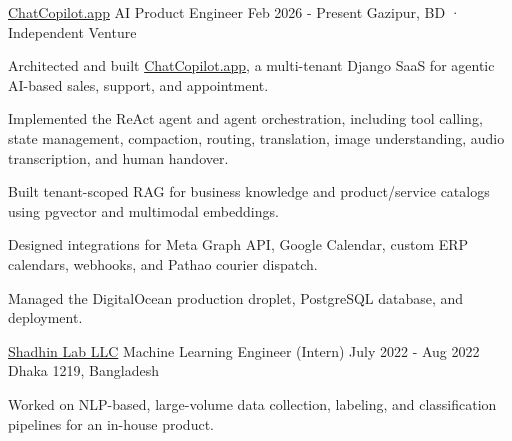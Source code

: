 \begin{cventries}
\cventry
    {\href{https://chatcopilot.app/}{ChatCopilot.app}} %
    {AI Product Engineer} %
    {Feb 2026 - Present} %
    {Gazipur, BD · Independent Venture} %
    {
      \begin{cvitems}
        \item{Architected and built \href{https://chatcopilot.app/}{ChatCopilot.app}, a multi-tenant Django SaaS for agentic AI-based sales, support, and appointment.}
        \item{Implemented the ReAct agent and agent orchestration, including tool calling, state management, compaction, routing, translation, image understanding, audio transcription, and human handover.}
        \item{Built tenant-scoped RAG for business knowledge and product/service catalogs using pgvector and multimodal embeddings.}
        \item{Designed integrations for Meta Graph API, Google Calendar, custom ERP calendars, webhooks, and Pathao courier dispatch.}
        \item{Managed the DigitalOcean production droplet, PostgreSQL database, and deployment.}
      \end{cvitems}
    }


\cventry
    {\href{https://shadhinlab.com/}{Shadhin Lab LLC}} %
    {Machine Learning Engineer (Intern)} %
    {July 2022 - Aug 2022} %
    {Dhaka 1219, Bangladesh} %
    {
      \begin{cvitems}
        \item{Worked on NLP-based, large-volume data collection, labeling, and classification pipelines for an in-house product.}
      \end{cvitems}
    }


\end{cventries}
